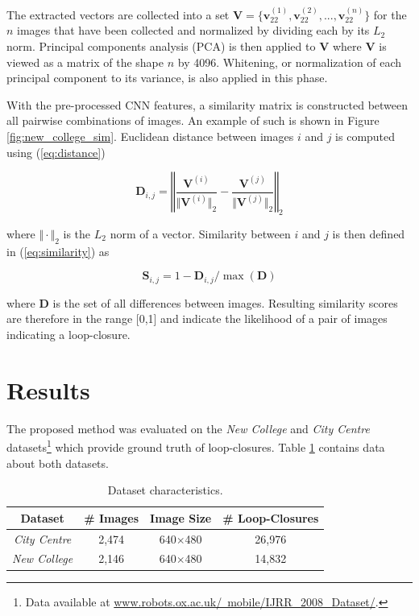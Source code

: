 \documentclass[10pt,twocolumn,letterpaper]{article}
\begin{document}
The extracted vectors are collected into a set $\mathbf{V} = 
\{\mathbf{v}_{22}^{(1)},\mathbf{v}_{22}^{(2)},...,\mathbf{v}_{22}^{(n)}\}$
for the $n$ images that have been collected and normalized by dividing each by its $L_2$ norm. Principal components analysis (PCA) is then applied to $\mathbf{V}$ where $\mathbf{V}$ is viewed as a matrix 
of the shape $n$ by 4096. Whitening, or normalization of each principal component to its variance, is also applied in this phase.

With the pre-processed CNN features, a similarity matrix is constructed between all pairwise combinations of images. An example of such is shown in Figure \ref{fig:new_college_sim}. Euclidean distance 
between images $i$ and $j$ is computed using (\ref{eq:distance})

\begin{equation}\label{eq:distance}
\mathbf{D}_{i,j} = \left\Vert \frac{\mathbf{V}^{(i)}}{\Vert\mathbf{V}^{(i)}\Vert_2} - \frac{\mathbf{V}^{(j)}}{\Vert\mathbf{V}^{(j)}\Vert_2} \right\Vert_2
\end{equation}

\noindent where $\Vert\cdot\Vert_2$ is the $L_2$ norm of a vector. Similarity between $i$ and $j$ is then defined in (\ref{eq:similarity}) as

\begin{equation}\label{eq:similarity}
\mathbf{S}_{i,j} = 1 - \mathbf{D}_{i,j}/\max(\mathbf{D})
\end{equation}

\noindent where $\mathbf{D}$ is the set of all differences between images. Resulting similarity scores are therefore in the range [0,1] and indicate the likelihood of a pair of images indicating a 
loop-closure.

\section{Results}
\label{sec:results}

The proposed method was evaluated on the \textit{New College} and \textit{City Centre} datasets\footnote{Data available at 
\href{http://www.robots.ox.ac.uk/~mobile/IJRR_2008_Dataset/}{www.robots.ox.ac.uk/~mobile/IJRR\_2008\_Dataset/}.} which provide ground truth of loop-closures. Table \ref{tab:datasets} contains data about 
both datasets.

\begin{table}[H]
\caption{Dataset characteristics.}
\label{tab:datasets}
\centering
\begin{tabular}{c||c|c|c}
Dataset & \# Images & Image Size & \# Loop-Closures\\
\hline
\textit{City Centre} & 2,474 & 640$\times$480 & 26,976\\
\textit{New College} & 2,146 & 640$\times$480 & 14,832\\
\end{tabular}
\end{table}
\end{document}
